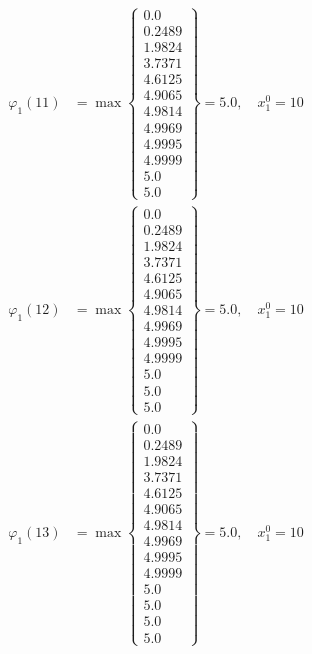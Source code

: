 \documentclass{article}
\begin{document}
\begin{align*}
\varphi_{1}(11) &= \max \left\{ \begin{array}{c}
0.0 \\
 0.2489 \\
 1.9824 \\
 3.7371 \\
 4.6125 \\
 4.9065 \\
 4.9814 \\
 4.9969 \\
 4.9995 \\
 4.9999 \\
 5.0 \\
 5.0
\end{array} \right\}=5.0, \quad x_{1}^0=10\\
  
\varphi_{1}(12) &= \max \left\{ \begin{array}{c}
0.0 \\
 0.2489 \\
 1.9824 \\
 3.7371 \\
 4.6125 \\
 4.9065 \\
 4.9814 \\
 4.9969 \\
 4.9995 \\
 4.9999 \\
 5.0 \\
 5.0 \\
 5.0
\end{array} \right\}=5.0, \quad x_{1}^0=10\\
  
\varphi_{1}(13) &= \max \left\{ \begin{array}{c}
0.0 \\
 0.2489 \\
 1.9824 \\
 3.7371 \\
 4.6125 \\
 4.9065 \\
 4.9814 \\
 4.9969 \\
 4.9995 \\
 4.9999 \\
 5.0 \\
 5.0 \\
 5.0 \\
 5.0
\end{array} \right\}=5.0, \quad x_{1}^0=10\\
  

\end{align*}
\end{document}
